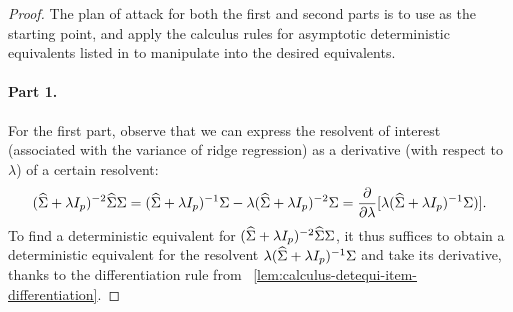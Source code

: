 \documentclass{article}
\begin{document}
\begin{proof}
    The plan of attack for both the first and second parts is to use 
    as the starting point,
    and apply the calculus rules for asymptotic deterministic equivalents 
    listed in 
    to manipulate into the desired equivalents.
    
    \paragraph{Part 1.}
    For the first part,
    observe that we can express the resolvent of interest 
    (associated with the variance of ridge regression)
    as a derivative (with respect to $\lambda$) of a certain resolvent:
   \begin{equation}
        \label{eq:deriv-def-genvar-ridge}
        ({\widehat{\Sigma}} + \lambda I_p)^{-2} {\widehat{\Sigma}} \Sigma
        = ({\widehat{\Sigma}} + \lambda I_p)^{-1} \Sigma - \lambda ({\widehat{\Sigma}} + \lambda I_p)^{-2} \Sigma
        = 
        \frac{\partial}{\partial \lambda}
        [\lambda ({\widehat{\Sigma}} + \lambda I_p)^{-1} \Sigma)].
   \end{equation}
   To find a deterministic equivalent for $({\widehat{\Sigma}} + \lambda I_p)^{-2} {\widehat{\Sigma}} \Sigma$,
   it thus suffices to obtain a deterministic equivalent for the resolvent
   $\lambda ({\widehat{\Sigma}} + \lambda I_p)^{-1} \Sigma$
   and take its derivative, 
   thanks to the differentiation rule from
    ~\eqref{lem:calculus-detequi-item-differentiation}.
    

\end{proof}
\end{document}
